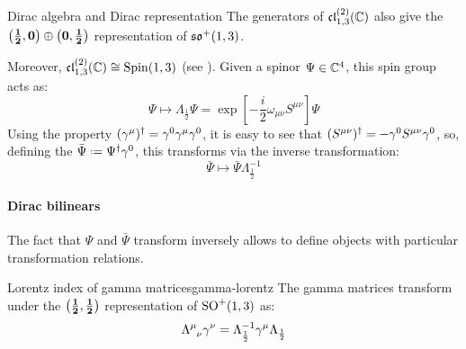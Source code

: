 \begin{proposition}{Dirac algebra and Dirac representation}{}
  The generators of $ \mathfrak{cl}_{1,3}^{(2)}(\mathbb{C}) $ also give the $ \mathbf{\left( \frac{1}{2},0 \right)} \oplus \mathbf{\left( 0,\frac{1}{2} \right)} $ representation of $ \mathfrak{so}^+(1,3) $.
\end{proposition}

Moreover, $ \mathfrak{cl}_{1,3}^{(2)}(\mathbb{C}) \cong \operatorname{Spin}(1,3) $ (see ). Given a spinor $ \Psi \in \mathbb{C}^4 $, this spin group acts as:
\begin{equation*}
  \Psi \mapsto \Lambda_{\frac{1}{2}} \Psi = \exp \left[ -\frac{i}{2} \omega_{\mu \nu} S^{\mu \nu} \right] \Psi
\end{equation*}
Using the property $ (\gamma^\mu)^\dagger = \gamma^0 \gamma^\mu \gamma^0 $, it is easy to see that $ (S^{\mu \nu})^\dagger = - \gamma^0 S^{\mu \nu} \gamma^0 $, so, defining the  $ \bar{\Psi} \defeq \Psi\dg \gamma^0 $, this transforms via the inverse transformation:
\begin{equation*}
  \bar{\Psi} \mapsto \bar{\Psi} \Lambda_{\frac{1}{2}}^{-1}
\end{equation*}

\paragraph{Dirac bilinears}

The fact that $ \Psi $ and $ \bar{\Psi} $ transform inversely allows to define objects with particular transformation relations.

\begin{theorem}{Lorentz index of gamma matrices}{gamma-lorentz}
  The gamma matrices transform under the $ \mathbf{\left( \frac{1}{2},\frac{1}{2} \right)} $ representation of $ \mathrm{SO}^+(1,3) $ as:
  \begin{equation}
    \tensor{\Lambda}{^\mu_\nu} \gamma^\nu = \Lambda_{\frac{1}{2}}^{-1} \gamma^\mu \Lambda_{\frac{1}{2}}
    \label{eq:gamma-lor-tr}
  \end{equation}
\end{theorem}

